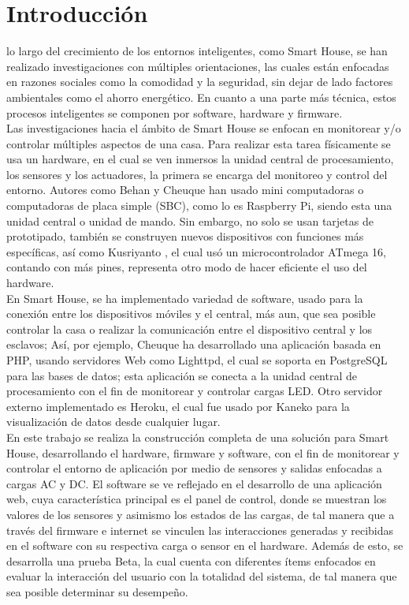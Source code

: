 \section{Introducción}

  lo largo del crecimiento de los entornos inteligentes, como Smart House, se han realizado investigaciones con múltiples orientaciones, las cuales están enfocadas en razones sociales como la comodidad y la seguridad, sin dejar de lado factores ambientales como el ahorro energético. En cuanto a una parte más técnica, estos procesos inteligentes se componen por software, hardware y firmware.\\ 
 
 Las investigaciones hacia el ámbito de Smart House se enfocan en monitorear y/o controlar múltiples aspectos de una casa. Para realizar esta tarea físicamente se usa un hardware, en el cual se ven inmersos la unidad central de procesamiento, los sensores y los actuadores, la primera se encarga del monitoreo y control del entorno. Autores como Behan \cite{Behan2013} y Cheuque \cite{Cheuque2015} han usado mini computadoras o computadoras de placa simple (SBC), como lo es Raspberry Pi, siendo esta una unidad central o unidad de mando. Sin embargo, no solo se usan tarjetas de prototipado, también se construyen nuevos dispositivos con funciones más específicas, así como Kusriyanto \cite{Kusriyanto2015}, el cual usó un microcontrolador ATmega 16, contando con más pines, representa otro modo de hacer eficiente el uso del hardware.\\ 
 
 En Smart House, se ha implementado variedad de software, usado para la conexión entre los dispositivos móviles y el central, más aun, que sea posible controlar la casa o realizar la comunicación entre el dispositivo central y los esclavos; Así, por ejemplo, Cheuque \cite{Cheuque2015} ha desarrollado una aplicación basada en PHP, usando servidores Web como Lighttpd, el cual se soporta en PostgreSQL para las bases de datos; esta aplicación se conecta a la unidad central de procesamiento con el fin de monitorear y controlar cargas LED. Otro servidor externo implementado es Heroku, el cual fue usado por Kaneko \cite{Kaneko2017} para la visualización de datos desde cualquier lugar.\\ 
 
 En este trabajo se realiza la construcción completa de una solución para Smart House, desarrollando el hardware, firmware y software, con el fin de monitorear y controlar el entorno de aplicación por medio de sensores y salidas enfocadas a cargas AC y DC. El software se ve reflejado en el desarrollo de una aplicación web, cuya característica principal es el panel de control, donde se muestran los valores de los sensores y asimismo los estados de las cargas, de tal manera que a través del firmware e internet se vinculen las interacciones generadas y recibidas en el software con su respectiva carga o sensor en el hardware. Además de esto, se desarrolla una prueba Beta, la cual cuenta con diferentes ítems enfocados en evaluar la interacción del usuario con la totalidad del sistema, de tal manera que sea posible determinar su desempeño.\\ 
 
